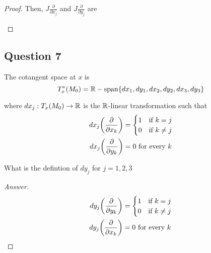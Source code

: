 \documentclass{article}
\begin{document}
\begin{proof}
Then, $J \frac{\partial}{\partial x_j}$ and $J \frac{\partial}{\partial y_j}$ are
\begin{center}
\end{center}


\end{proof}

\subsection{Question 7}

The cotangent space at $x$ is 
$$
    T_x^*(M_0) = \R-\Span \set*{dx_1, dy_1, dx_2, dy_2, dx_3, dy_3}
$$

where $dx_j: T_x(M_0) \to \mathbb{R}$ is the $\mathbb{R}$-linear transformation such that
\begin{align*}
    dx_j \tuple*{\frac{\partial}{\partial x_k}} &= \begin{cases}
        1 &\text{if $k=j$} \\
        0 &\text{if $k \neq j$}
    \end{cases} \\
    dx_j \tuple*{\frac{\partial}{\partial y_k}} &= 0 \text{ for every $k$}
\end{align*}

What is the defintion of $dy_j$ for $j=1,2,3$

\begin{proof}[Answer]

\begin{align*}
    dy_j \tuple*{\frac{\partial}{\partial y_k}} &= \begin{cases}
        1 &\text{if $k=j$} \\
        0 &\text{if $k \neq j$}
    \end{cases} \\
    dy_j \tuple*{\frac{\partial}{\partial x_k}} &= 0 \text{ for every $k$}
\end{align*}

\end{proof}
\end{document}

